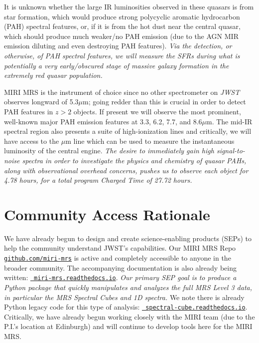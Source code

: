 \smallskip \smallskip
\noindent
It is unknown whether the large IR luminosities observed in these
quasars is from star formation, which would produce strong polycyclic
aromatic hydrocarbon (PAH) spectral features, or, if it is from the hot
dust near the central quasar, which should produce much weaker/no PAH
emission (due to the AGN MIR emission diluting and even destroying PAH
features). {\it Via the detection, or otherwise, of PAH spectral
features, we will measure the SFRs during what is potentially a very
early/obscured stage of massive galaxy formation in the extremely red
quasar population.}

\smallskip \smallskip
\noindent
MIRI MRS is the instrument of choice since no other spectrometer on
{\it JWST} observes longward of 5.3$\mu$m; going redder than this is
crucial in order to detect PAH features in $z>2$ objects.  If present
we will observe the most prominent, well-known major PAH emission
features at 3.3, 6.2, 7.7, and 8.6$\mu$m. The mid-IR spectral region
also presents a suite of high-ionization lines
and critically,  we will have access to the $\mu$m line which 
can be used to measure the instantaneous luminosity of the central engine.
 {\it The desire to immediately
gain high signal-to-noise spectra in order to investigate the physics
and chemistry of quasar PAHs, along with observational overhead
concerns, pushes us to observe each object for 4.78 hours, for a total
program Charged Time of 27.72 hours.}


\section*{Community Access Rationale}
\vspace{-6pt}
\noindent
We have already begun to design and create science-enabling products
(SEPs) to help the community understand JWST's capabilities.  Our MIRI
MRS Repo \href{https://github.com/miri-mrs}{{\tt github.com/miri-mrs}}
is active and completely accessible to anyone in the broader
community.  The accompanying documentation is also already being
written: \href{http://miri-mrs.readthedocs.io/}{{\tt
miri-mrs.readthedocs.io}}.  {\it Our primary SEP goal is to produce a
Python package that quickly manipulates and analyzes the full MRS
Level 3 data, in particular the MRS Spectral Cubes and 1D spectra. }
We note there is already Python legacy code for this type of analysis:
\href{https://spectral-cube.readthedocs.io/}{\tt
spectral-cube.readthedocs.io}. Critically, we have
already begun working closely with the MIRI team (due to the P.I.'s
location at Edinburgh) and will continue to develop tools here for the
MIRI MRS.

